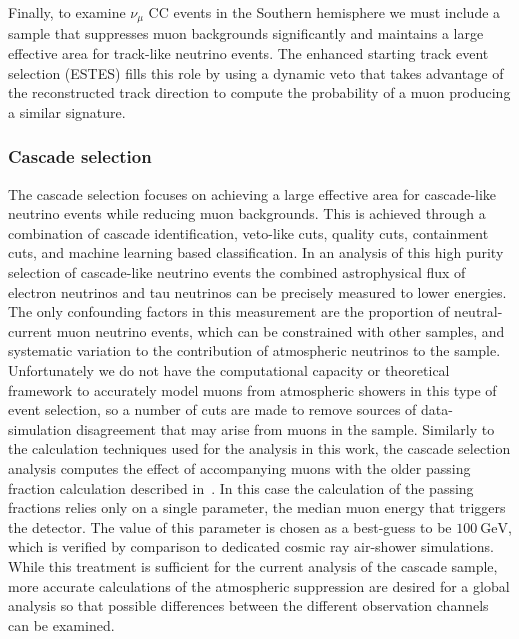 Finally, to examine $\nu_\mu$ CC events in the Southern hemisphere we must include a sample that suppresses muon backgrounds significantly and maintains a large effective area for track-like neutrino events.
The enhanced starting track event selection (ESTES) fills this role by using a dynamic veto that takes advantage of the reconstructed track direction to compute the probability of a muon producing a similar signature.

\subsubsection{Cascade selection}
The cascade selection focuses on achieving a large effective area for cascade-like neutrino events while reducing muon backgrounds.
This is achieved through a combination of cascade identification, veto-like cuts, quality cuts, containment cuts, and machine learning based classification.
In an analysis of this high purity selection of cascade-like neutrino events the combined astrophysical flux of electron neutrinos and tau neutrinos can be precisely measured to lower energies.
The only confounding factors in this measurement are the proportion of neutral-current muon neutrino events, which can be constrained with other samples, and systematic variation to the contribution of atmospheric neutrinos to the sample.
Unfortunately we do not have the computational capacity or theoretical framework to accurately model muons from atmospheric showers in this type of event selection, so a number of cuts are made to remove sources of data-simulation disagreement that may arise from muons in the sample.
Similarly to the calculation techniques used for the analysis in this work, the cascade selection analysis computes the effect of accompanying muons with the older passing fraction calculation described in~\cite{Gaisser:2014bja}.
In this case the calculation of the passing fractions relies only on a single parameter, the median muon energy that triggers the detector.
The value of this parameter is chosen as a best-guess to be $\SI{100}\GeV$, which is verified by comparison to dedicated cosmic ray air-shower simulations.
While this treatment is sufficient for the current analysis of the cascade sample, more accurate calculations of the atmospheric suppression are desired for a global analysis so that possible differences between the different observation channels can be examined.

